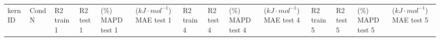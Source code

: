 \documentclass[journal=jceaax,manuscript=article]{achemso}
\begin{document}
\begin{table}[H]
    \centering
    \begin{tabular}{>{\centering\arraybackslash}p{1.0cm}>{\centering\arraybackslash}p{1.0cm}>{\centering\arraybackslash}p{0.75cm}>{\centering\arraybackslash}p{0.75cm}>{\centering\arraybackslash}p{1.0cm}>{\centering\arraybackslash}p{1.0cm}>{\centering\arraybackslash}p{0.75cm}>{\centering\arraybackslash}p{0.75cm}>{\centering\arraybackslash}p{1cm}>{\centering\arraybackslash}p{0.75cm}>{\centering\arraybackslash}p{0.75cm}>{\centering\arraybackslash}p{0.75cm}>{\centering\arraybackslash}p{1cm}>{\centering\arraybackslash}p{0.75cm}}
       \vspace{1.15cm}  kern ID& 
       \vspace{1.15cm} Cond   N& 
       \vspace{0.66cm} R2  train     1&  
 \vspace{0.66cm} R2  test   1& 
 \vspace{0.146cm} (\%) MAPD test \hspace{0.5cm}  1&  
 ($kJ \cdot mol^{-1}$) MAE test  \hspace{0.5cm}   1&  \vspace{0.66cm} R2 train   4& 
 \vspace{0.66cm} R2 test   4& 
 \vspace{0.146cm} (\%) MAPD test  \hspace{0.5cm}  4&  
 ($kJ \cdot mol^{-1}$) MAE test  \hspace{0.5cm}   4& \vspace{0.66cm} R2   train      5& 
 \vspace{0.66cm} R2   test     5& 
 \vspace{0.146cm} (\%) MAPD test  \hspace{0.5cm}   5&
 ($kJ \cdot mol^{-1}$) MAE test  \hspace{0.5cm}   5
 


\end{tabular}
\end{table}
\end{document}
